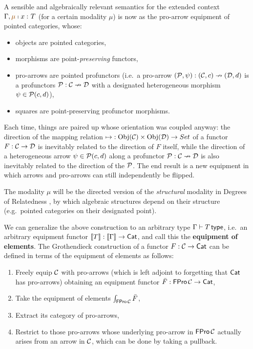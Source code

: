 \documentclass[twoLevelNum]{higherStructures} %
\begin{document}
A sensible and algebraically relevant semantics for the extended context $\Gamma, \ctxmodnovar \mu x T$ (for a certain modality $\mu$) is now as the pro-arrow equipment of pointed categories, whose:
\begin{itemize}
	\item objects are pointed categories,
	\item morphisms are point-\emph{preserving} functors,
	\item pro-arrows are pointed profunctors (i.e.\ a pro-arrow $({\mathcal{P}}, \psi) : ({\mathcal{C}}, c) \nrightarrow ({\mathcal{D}}, d)$ is a profunctors ${\mathcal{P}} : {\mathcal{C}} \nrightarrow {\mathcal{D}}$ with a designated heterogeneous morphism $\psi \in {\mathcal{P}}(c, d)$),
	\item squares are point-preserving profunctor morphisms.
\end{itemize}
Each time, things are paired up whose orientation was coupled anyway: the direction of the mapping relation ${\mapsto} : \mathrm{Obj}(\mathcal{C}) \times \mathrm{Obj}({\mathcal{D}}) \to Set$ of a functor $F : {\mathcal{C}} \to {\mathcal{D}}$ is inevitably related to the direction of $F$ itself, while the direction of a heterogeneous arrow $\psi \in {\mathcal{P}}(c, d)$ along a profunctor ${\mathcal{P}} : {\mathcal{C}} \nrightarrow {\mathcal{D}}$ is also inevitably related to the direction of the ${\mathcal{P}}$.
The end result is a new equipment in which arrows and pro-arrows can still independently be flipped.

The modality $\mu$ will be the directed version of the \emph{structural} modality in Degrees of Relatedness \cite{reldtt}, by which algebraic structures depend on their structure (e.g.\ pointed categories on their designated point).

We can generalize the above construction to an arbitrary type $\Gamma \vdash T \,\mathsf{type}$, i.e.\ an arbitrary equipment functor $\mathopen{}\left\llbracket T \right\rrbracket\mathclose{} : \mathopen{}\left\llbracket \Gamma \right\rrbracket\mathclose{} \to {\mathsf{Cat}}$, and call this the \textbf{equipment of elements}.
The Grothendieck construction of a functor $F : {\mathcal{C}} \to {\mathsf{Cat}}$ can be defined in terms of the equipment of elements as follows:
\begin{enumerate}
	\item Freely equip ${\mathcal{C}}$ with pro-arrows (which is left adjoint to forgetting that ${\mathsf{Cat}}$ has pro-arrows) obtaining an equipment functor $\bar F : \mathsf{FPro}\,{\mathcal{C}} \to {\mathsf{Cat}}$,
	\item Take the equipment of elements $\int_{\mathsf{FPro}\,{\mathcal{C}}} \bar F$,
	\item Extract its category of pro-arrows,
	\item Restrict to those pro-arrows whose underlying pro-arrow in $\mathsf{FPro}\,{\mathcal{C}}$ actually arises from an arrow in ${\mathcal{C}}$, which can be done by taking a pullback.
\end{enumerate}
\end{document}
